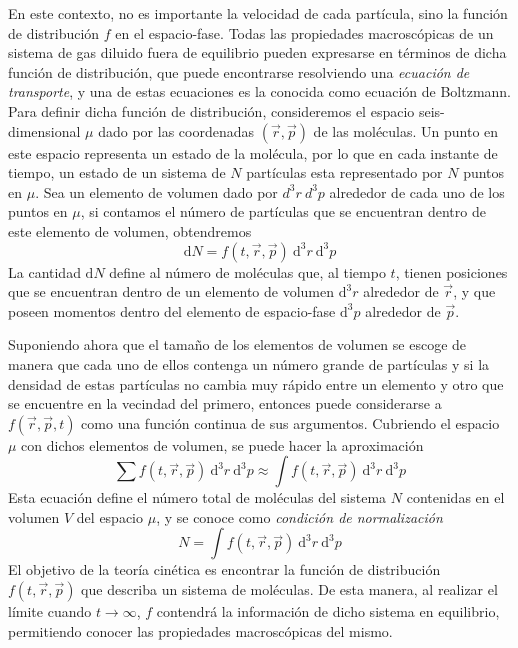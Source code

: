\documentclass[11pt,twoside,openright,spanish]{report}
\numberwithin{equation}{chapter}
\numberwithin{figure}{chapter}
\numberwithin{table}{chapter}
\begin{document}
En este contexto, no es importante la velocidad de cada partícula, sino la función de distribución $f$ en el espacio-fase. Todas las propiedades macroscópicas de un sistema de gas diluido fuera de equilibrio pueden expresarse en términos de dicha función de distribución, que puede encontrarse resolviendo una \emph{ecuación de transporte}, y una de estas ecuaciones es la conocida como ecuación de Boltzmann. Para definir dicha función de distribución, consideremos el espacio seis-dimensional $\mu$ dado por las coordenadas $\left(\vec{r},\vec{p}\right)$ de las moléculas. Un punto en este espacio representa un estado de la molécula, por lo que en cada instante de tiempo, un estado de un sistema de $N$ partículas esta representado por $N$ puntos en $\mu$. Sea un elemento de volumen dado por $d^3r\ d^3p$ alrededor de cada uno de los puntos en $\mu$, si contamos el número de partículas que se encuentran dentro de este elemento de volumen, obtendremos
\begin{equation}
\text{d}N=f\left(t,\vec{r},\vec{p}\right)\ \text{d}^3r\ \text{d}^3p
\end{equation}
La cantidad $\text{d}N$ define al número de moléculas que, al tiempo $t$, tienen posiciones que se encuentran dentro de un elemento de volumen $\text{d}^3r$ alrededor de $\vec{r}$, y que poseen momentos dentro del elemento de espacio-fase $\text{d}^3p$ alrededor de $\vec{p}$. 

Suponiendo ahora que el tamaño de los elementos de volumen se escoge de manera que cada uno de ellos contenga un número grande de partículas y si la densidad de estas partículas no cambia muy rápido entre un elemento y otro que se encuentre en la vecindad del primero, entonces puede considerarse a $f\left(\vec{r},\vec{p},t\right)$ como una función continua de sus argumentos. Cubriendo el espacio $\mu$ con dichos elementos de volumen, se puede hacer la aproximación
\begin{equation}
\sum f\left(t,\vec{r},\vec{p}\right)\ \text{d}^3r\ \text{d}^3p\approx\int f\left(t,\vec{r},\vec{p}\right)\ \text{d}^3r\ \text{d}^3p
\end{equation}
Esta ecuación define el número total de moléculas del sistema $N$ contenidas en el volumen $V$ del espacio $\mu$, y se conoce como \textit{condición de normalización}
\begin{equation}
N=\int f\left(t,\vec{r},\vec{p}\right)\ \text{d}^3r\ \text{d}^3p
\end{equation}
El objetivo de la teoría cinética es encontrar la función de distribución $f\left(t,\vec{r},\vec{p}\right)$ que describa un sistema de moléculas. De esta manera, al realizar el límite cuando $t\rightarrow \infty$, $f$ contendrá la información de dicho sistema en equilibrio, permitiendo conocer las propiedades macroscópicas del mismo.
\end{document}
